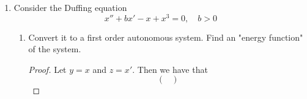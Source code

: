 \documentclass[../psets.tex]{subfiles}
\begin{document}
\begin{enumerate}
\begin{enumerate}
\begin{proof}
\begin{equation*}
                =
                \begin{pmatrix}
                    -\mu r^3\\
                    -1\\
                \end{pmatrix}
            \end{equation*}
            for $r\geq 0$ and $\theta\in\R$. Solving the componentwise separable ODEs, we can deduce that the flow is
            \begin{equation*}
                \phi_t
                \begin{pmatrix}
                    z\\
                    w\\
                \end{pmatrix}
                =
                \begin{pmatrix}
                    \sqrt{\frac{z^2}{1+2\mu z^2t}}\\
                    w-t\\
                \end{pmatrix}
            \end{equation*}
            Consequently, for arbitrary $\mu>0$ and $x=(z,w)^T\in\R^2$, the denominator $1+2\mu z^2t\to\infty$ as $t\to +\infty$. Therefore, $r\to 0$ as $t\to +\infty$, so since we're using polar coordinates, $\phi_t(x)\to 0$, as desired.\par
            On the other hand, let $\mu<0$ and $x=(z,w)^T\in\R^2$ be arbitrary. Then as $t\to -1/2\mu z^2$ (a positive quantity since $\mu<0$), the denominator $1+2\mu z^2t\to 0$. Therefore, the overall term and consequently $r$ blows up in finite time.
        \end{proof}
    \end{enumerate}
    \item Consider the Duffing equation
    \begin{equation*}
        x''+bx'-x+x^3 = 0
        ,\quad
        b>0
    \end{equation*}
    \begin{enumerate}
        \item Convert it to a first order autonomous system. Find an "energy function" of the system.
        \begin{proof}
            Let $y=x$ and $z=x'$. Then we have that
            \begin{equation*}
                \boxed{
                    {
                        \begin{pmatrix}

\end{pmatrix}}}
\end{equation*}
\end{proof}
\end{enumerate}
\end{enumerate}
\end{document}
